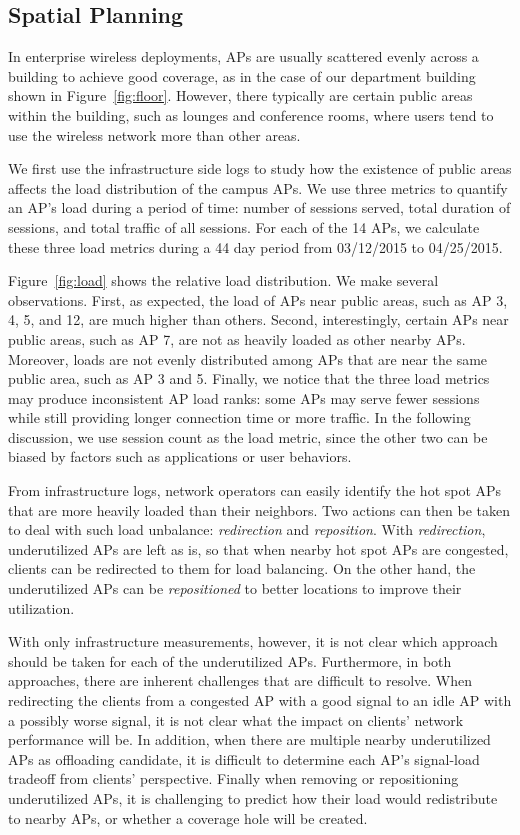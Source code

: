 \subsection{Spatial Planning}
\label{subsec:spatial}

In enterprise wireless deployments, APs are usually scattered evenly across a building
to achieve good coverage, as in the case of our department building shown in
Figure~\ref{fig:floor}. However, there typically are certain public areas within
the building, such as lounges and conference rooms, where users tend to use the
wireless network more than other areas.

We first use the infrastructure side logs to study how the existence of public
areas affects the load distribution of the campus APs. We use three metrics to
quantify an AP's load during a period of time: number of \wifi{} sessions
served, total duration of \wifi{} sessions, and total traffic of all sessions.
For each of the 14 APs, we calculate these three load metrics during a 44 day
period from 03/12/2015 to 04/25/2015.

Figure~\ref{fig:load} shows the relative load distribution. We make several
observations. First, as expected, the load of APs near public areas, such as AP
3, 4, 5, and 12, are much higher than others. Second, interestingly, certain APs
near public areas, such as AP 7, are not as heavily loaded as other nearby APs.
Moreover, loads are not evenly distributed among APs that are near the same
public area, such as AP 3 and 5. Finally, we notice that the three load metrics
may produce inconsistent AP load ranks: some APs may serve fewer \wifi{}
sessions while still providing longer connection time or more traffic. In the
following discussion, we use session count as the load metric, since the other
two can be biased by factors such as applications or user behaviors.

From infrastructure logs, network operators can easily identify the hot spot APs
that are more heavily loaded than their neighbors. Two actions can then be taken
to deal with such load unbalance: \textit{redirection} and \textit{reposition}.
With \textit{redirection}, underutilized APs are left as is, so that
when nearby hot spot APs are congested, clients can be redirected to them for
load balancing. On the other hand, the underutilized APs can be
\textit{repositioned} to better locations to improve their utilization.

With only infrastructure measurements, however, it is not clear which approach
should be taken for each of the underutilized APs. Furthermore, in both
approaches, there are inherent challenges that are difficult to resolve.  When
redirecting the clients from a congested AP with a good signal to an idle AP with
a possibly worse signal, it is not clear what the impact on clients' network
performance will be. In addition, when there are multiple nearby underutilized APs as
offloading candidate, it is difficult to determine each AP's signal-load
tradeoff from clients' perspective. Finally when removing or repositioning
underutilized APs, it is challenging to predict how their load would
redistribute to nearby APs, or whether a coverage hole will be created.

